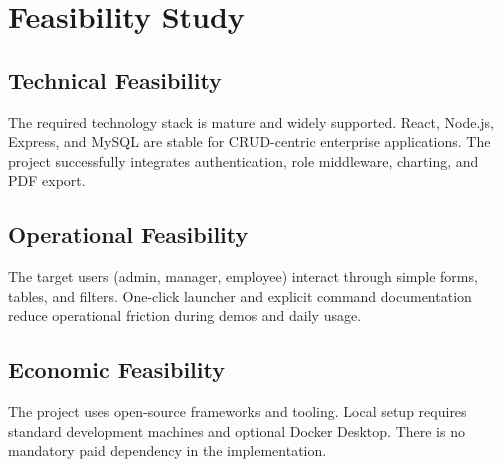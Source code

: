 ﻿\chapter{Feasibility Study}

\section{Technical Feasibility}
The required technology stack is mature and widely supported. React, Node.js, Express, and MySQL are stable for CRUD-centric enterprise applications. The project successfully integrates authentication, role middleware, charting, and PDF export.

\section{Operational Feasibility}
The target users (admin, manager, employee) interact through simple forms, tables, and filters. One-click launcher and explicit command documentation reduce operational friction during demos and daily usage.

\section{Economic Feasibility}
The project uses open-source frameworks and tooling. Local setup requires standard development machines and optional Docker Desktop. There is no mandatory paid dependency in the implementation.
